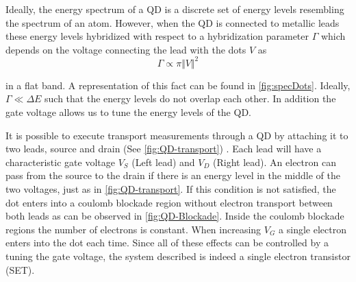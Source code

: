

Ideally, the energy spectrum of a QD is a discrete set of energy levels resembling the spectrum of an atom. However, when the QD is connected to metallic leads these energy levels hybridized with respect to a hybridization parameter $\Gamma$ which depends on the voltage connecting the lead with the dots $V$ as 
\begin{equation}
    \Gamma \propto \pi \Vert V \Vert^2
\end{equation}

in a flat band. A representation of this fact can be found in  \ref{fig:specDots}. Ideally, $\Gamma \ll \Delta E$ such that the energy levels do not overlap each other. In addition the gate voltage allows us to tune the energy levels of the QD.

It is possible to execute transport measurements through a QD by attaching it to two leads, source and drain (See \ref{fig:QD-transport}) . Each lead will have a characteristic gate voltage $V_S$ (Left lead) and $V_D$ (Right lead). An electron can pass from the source to the drain if there is an energy level in the middle of the two voltages, just as in \ref{fig:QD-transport}. If this condition is not satisfied,  the dot enters into a coulomb blockade region without  electron transport between both leads as can be observed in \ref{fig:QD-Blockade}. Inside the coulomb blockade regions the number of electrons is constant. When increasing $V_G$ a single electron enters into the dot each time. Since all of these effects can be controlled by a tuning the gate voltage, the system described is indeed a single electron transistor (SET).  










